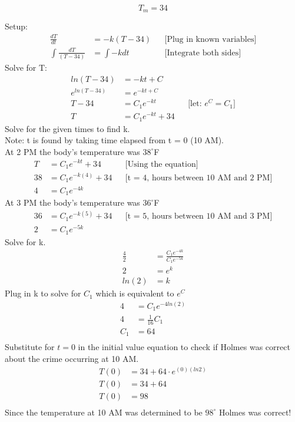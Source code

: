 \documentclass{article}
\begin{document}
\begin{flushleft}
{\[ T_m = 34 \]

Setup:
\begin{align*}
\frac{dT}{dt} & = -k(T-34) && \text{[Plug in known variables]}\\
\int \frac{dT}{(T-34)} & = \int -kdt && \text{[Integrate both sides]}
\end{align*}
\bigskip
Solve for T:\\
\begin{align*}
ln(T - 34) & =  -kt + C \\
e^{ln(T - 34)} & = e^{-kt + C} \\
T - 34 & = C_1e^{-kt} && \text{[let: $e^C = C_1$]}\\
T & = C_1e^{-kt} +34
\end{align*}
Solve for the given times to find k. \\
Note: t is found by taking time elapsed from t = 0 (10 AM).\\
At 2 PM the body's temperature was $38^{\circ}$F\\
\begin{align*}
T & = C_1e^{-kt} + 34 && \text{[Using the equation]} \\
38 & = C_1e^{-k(4)} + 34 && \text{[t = 4, hours between 10 AM and  2 PM]} \\
4 & = C_1e^{-4k}
\end{align*}
At 3 PM the body's temperature was $36^{\circ}$F\\
\begin{align*}
36 & = C_1e^{-k(5)} + 34 && \text{[t = 5, hours between 10 AM and  3 PM]} \\
2 & = C_1e^{-5k}
\end{align*}
Solve for k.\\
\begin{align*}
\frac{4}{2} & = \frac{C_1e^{-4k}}{C_1e^{-5k}}\\
2 & = e^k\\
ln(2) & = k
\end{align*}
Plug in k to solve for $C_1$ which is equivalent to $e^C$
\begin{align*}
4 & = C_1e^{-4ln(2)} \\
4 & = \frac{1}{16}C_1 \\
C_1 & = 64 \\
\end{align*}
Substitute for $t = 0$ in the initial value equation to check if Holmes was correct about the crime occurring at 10 AM.
\begin{align*}
T(0) & = 34 + 64 \cdot e^{(0)(ln2)}\\
T(0) & = 34 + 64\\
T(0) & = 98 \\
\end{align*}
\bigskip
Since the temperature at 10 AM was determined to be $98^{\circ}$ Holmes was correct!\\

}
\end{flushleft}
\end{document}
